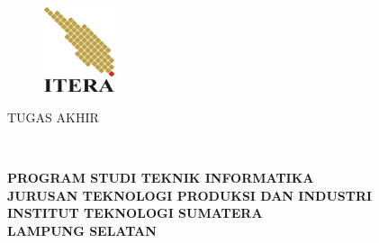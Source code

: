 \clearpage
\pagestyle{empty}

\begin{center}
\smallskip

    \begin{figure}[h]
    	\centering
    	\includegraphics[width=2.1cm, height=2.5cm, keepaspectratio]{resources/itera-logo}
    \end{figure}

	\large \bfseries \MakeUppercase{\thetitle}
	\vfill

    \large \uppercase{Tugas Akhir}
    \vfill

    \normalsize \normalfont \theauthor\\
    \printnim
    \vfill

    \normalsize \bfseries
    \uppercase{
        Program Studi Teknik Informatika \\
        Jurusan Teknologi Produksi dan Industri\\
        Institut Teknologi Sumatera\\
        Lampung Selatan
    }\medskip

    \the\year{}

\end{center}

\clearpage
